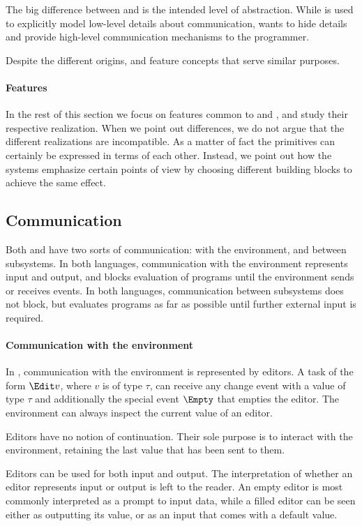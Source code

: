 The big difference between \CSP and \TOP is the intended level of abstraction.
While \CSP is used to explicitly model low-level details about communication, \TOP wants to hide details and provide high-level communication mechanisms to the programmer.

Despite the different origins, \TOP and \CSP feature concepts that serve similar purposes.


\paragraph{Features}

In the rest of this section we focus on features common to \TOP and \CSP, and study their respective realization.
When we point out differences, we do not argue that the different realizations are incompatible.
As a matter of fact the primitives can certainly be expressed in terms of each other.
Instead, we point out how the systems emphasize certain points of view by choosing different building blocks to achieve the same effect.


\subsection{Communication}

Both \TOP and \CSP have two sorts of communication: with the environment, and between subsystems.
In both languages, communication with the environment represents input and output, and blocks evaluation of programs until the environment sends or receives events.
In both languages, communication between subsystems does not block, but evaluates programs as far as possible until further external input is required.

\paragraph{Communication with the environment}
In \TOP, communication with the environment is represented by editors.
A task of the form $\Edit v$, where $v$ is of type $\tau$, can receive any change event with a value of type $\tau$ and additionally the special event $\Empty$ that empties the editor.
The environment can always inspect the current value of an editor.

Editors have no notion of continuation.
Their sole purpose is to interact with the environment, retaining the last value that has been sent to them.

Editors can be used for both input and output.
The interpretation of whether an editor represents input or output is left to the reader.
An empty editor is most commonly interpreted as a prompt to input data, while a filled editor can be seen either as outputting its value, or as an input that comes with a default value.

